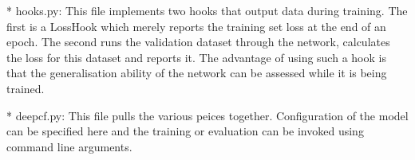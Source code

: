 \documentclass{article} %
\begin{document}
* hooks.py: This file implements two hooks that output data during training. The first is a LossHook which merely reports the training set loss at the end of an epoch. The second runs the validation dataset through the network, calculates the loss for this dataset and reports it. The advantage of using such a hook is that the generalisation ability of the network can be assessed while it is being trained. 

* deepcf.py: This file pulls the various peices together. Configuration of the model can be specified here and the training or evaluation can be invoked using command line arguments. 
\end{document}
